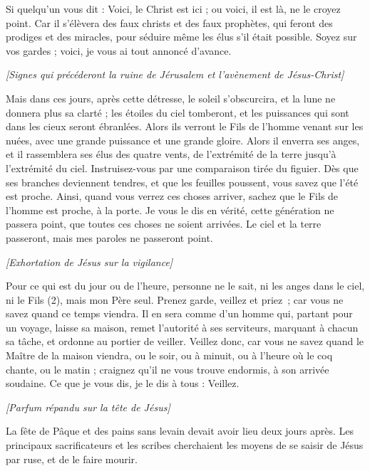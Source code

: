 \begin{multicols}{2}
Si quelqu'un vous dit : Voici, le Christ est ici ; ou voici, il est là, ne le croyez point.
Car il s'élèvera des faux christs et des faux prophètes, qui feront des prodiges et des miracles, pour séduire même les élus s'il était possible.
Soyez sur vos gardes ; voici, je vous ai tout annoncé d’avance.
\begin{center}
\textit{[Signes qui précéderont la ruine de Jérusalem et l'avènement de Jésus-Christ]}
\end{center}
\PPE{}
Mais dans ces jours, après cette détresse, le soleil s’obscurcira, et la lune ne donnera plus sa clarté ;
les étoiles du ciel tomberont, et les puissances qui sont dans les cieux seront ébranlées.
Alors ils verront le Fils de l'homme venant sur les nuées, avec une grande puissance et une grande gloire.
Alors il enverra ses anges, et il rassemblera ses élus des quatre vents, de l’extrémité de la terre jusqu’à l’extrémité du ciel.
Instruisez-vous par une comparaison tirée du figuier. Dès que ses branches deviennent tendres, et que les feuilles poussent, vous savez que l'été est proche.
Ainsi, quand vous verrez ces choses arriver, sachez que le Fils de l’homme est proche, à la porte.
Je vous le dis en vérité, cette génération ne passera point, que toutes ces choses ne soient arrivées.
Le ciel et la terre passeront, mais mes paroles ne passeront point.
\begin{center}
\textit{[Exhortation de Jésus sur la vigilance]}
\end{center}
\PPE{}
Pour ce qui est du jour ou de l’heure, personne ne le sait, ni les anges dans le ciel, ni le Fils (2), mais mon Père seul.
Prenez garde, veillez et priez ; car vous ne savez quand ce temps viendra.
Il en sera comme d’un homme qui, partant pour un voyage, laisse sa maison, remet l’autorité à ses serviteurs, marquant à chacun sa tâche, et ordonne au portier de veiller.
Veillez donc, car vous ne savez quand le Maître de la maison viendra, ou le soir, ou à minuit, ou à l'heure où le coq chante, ou le matin ;
craignez qu’il ne vous trouve endormis, à son arrivée soudaine.
Ce que je vous dis, je le dis à tous : Veillez.
\begin{center}
\textit{[Parfum répandu sur la tête de Jésus]}
\end{center}
\VerseOne{}La fête de Pâque et des pains sans levain devait avoir lieu deux jours après. Les principaux sacrificateurs et les scribes cherchaient les moyens de se saisir de Jésus par ruse, et de le faire mourir.

\end{multicols}
